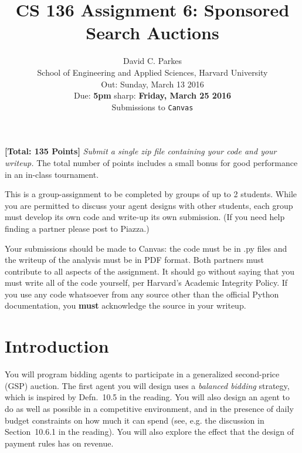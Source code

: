 \documentclass[11pt]{article}
\newcommand{\points}[1]{\textbf{[#1 Points]}}
\begin{document}
\title{CS 136 Assignment 6: Sponsored Search Auctions}
	\author{David C. Parkes  \\
	School of Engineering and Applied Sciences, Harvard University \\
	Out: Sunday, March 13 2016\\
	Due: {\bf 5pm} sharp: {\bf Friday, March 25 2016}\\
	Submissions to {\tt Canvas}}
\date{}

\maketitle

\noindent \points{Total: 135} {\em Submit a single zip file containing
  your code and your writeup.} The total number of points includes a
small bonus for good performance in an in-class tournament.

This is a group-assignment to be completed by groups of
up to 2 students. While you are permitted to discuss your agent
designs with other students, each group must develop its own code and
write-up its own submission. (If you need help finding a partner
please post to Piazza.)

Your submissions should be made to Canvas: the code must be in .py files and the writeup of the
analysis must be in PDF format. Both partners must contribute to all aspects of the assignment.
It should go without saying that you must write all of the code yourself, per Harvard's Academic
Integrity Policy. If you use any code whatsoever from any source other than the official Python
documentation, you \textbf{must} acknowledge the source in your writeup.

\section{Introduction}

You will program bidding agents to participate in a generalized
second-price (GSP) auction.  The first agent you will design uses a
{\em balanced bidding} strategy, which is inspired by Defn.~10.5 in
the reading.  You will also design an agent to do as well as possible
in a competitive environment, and in the presence of daily budget
constraints on how much it can spend (see, e.g. the discussion in
Section~10.6.1 in the reading).  You will also explore the effect that
the design of payment rules has on revenue.
\end{document}
